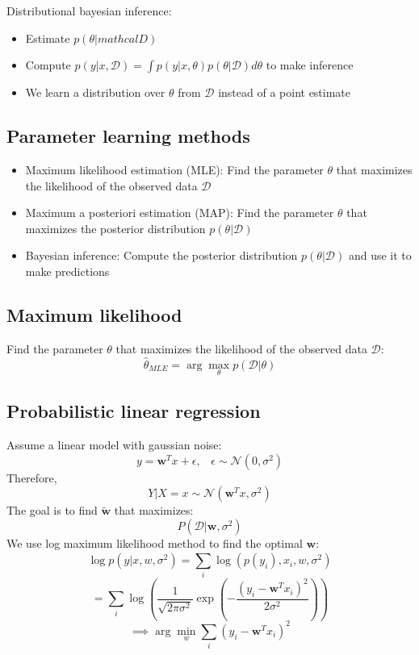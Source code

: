 \documentclass[12pt,a4paper]{article}
\begin{document}
Distributional bayesian inference:
\begin{itemize}
    \item Estimate $p(\theta|mathcal{D})$ 
    \item Compute $p(y|x, \mathcal{D}) = \int p(y|x, \theta)p(\theta|\mathcal{D}) d\theta$ to make inference
    \item We learn a distribution over $\theta$ from $\mathcal{D}$ instead of a point estimate
\end{itemize}

\subsection{Parameter learning methods}
\begin{itemize}
    \item Maximum likelihood estimation (MLE): Find the parameter $\theta$ that maximizes the likelihood of the observed data $\mathcal{D}$
    \item Maximum a posteriori estimation (MAP): Find the parameter $\theta$ that maximizes the posterior distribution $p(\theta|\mathcal{D})$
    \item Bayesian inference: Compute the posterior distribution $p(\theta|\mathcal{D})$ and use it to make predictions
\end{itemize}

\subsection{Maximum likelihood}
Find the parameter $\theta$ that maximizes the likelihood of the observed data $\mathcal{D}$:
\[
\hat{\theta}_{MLE} = \arg \max_{\theta} p(\mathcal{D}|\theta)
\]
\subsection{Probabilistic linear regression}
Assume a linear model with gaussian noise:
\[
y = \mathbf{w}^T x + \epsilon, \hspace{10pt} \epsilon \sim \mathcal{N}(0, \sigma^2)
\]
Therefore, 
\[
Y|X = x \sim \mathcal{N}(\mathbf{w}^T x, \sigma^2)
\]
The goal is to find $\mathbf{\tilde{w}}$ that maximizes:
\[
P(\mathcal{D} | \mathbf{w}, \sigma^2)
\]
We use log maximum likelihood method to find the optimal $\mathbf{w}$:
\[
\log p(y|x,w,\sigma^2) = \sum_{i}^{} \log(p(y_i), x_i, w, \sigma^2)
\]
\[
= \sum_{i}^{} \log \left( \frac{1}{\sqrt{2\pi\sigma^2}} \exp\left( -\frac{(y_i - \mathbf{w}^T x_i)^2}{2\sigma^2} \right) \right) 
\]
\[
\implies \arg\min_{w} \sum_{i}^{} (y_i - \mathbf{w}^T x_i)^2
\]
\end{document}
